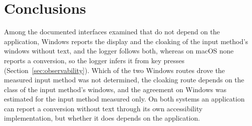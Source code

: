 
\section{Conclusions}
\label{sec:conclusions}

Among the documented interfaces examined that do not depend on the application, Windows reports the display and the
cloaking of the input method's windows without text, and the logger follows both, whereas on macOS none reports a
conversion, so the logger infers it from key presses (Section~\ref{sec:observability}). Which of the two Windows routes
drove the measured input method was not determined, the cloaking route depends on the class of the input method's
windows, and the agreement on Windows was estimated for the input method measured only. On both systems an application
can report a conversion without text through its own accessibility implementation, but whether it does depends on the
application.

